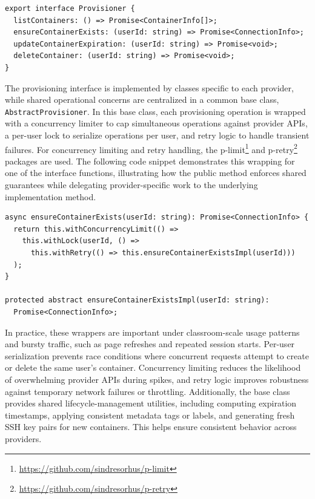 \begin{verbatim}
export interface Provisioner {
  listContainers: () => Promise<ContainerInfo[]>;
  ensureContainerExists: (userId: string) => Promise<ConnectionInfo>;
  updateContainerExpiration: (userId: string) => Promise<void>;
  deleteContainer: (userId: string) => Promise<void>;
}
\end{verbatim}

The provisioning interface is implemented by classes specific to each provider, while shared operational concerns are centralized in a common base class, \texttt{AbstractProvisioner}.
In this base class, each provisioning operation is wrapped with a concurrency limiter to cap simultaneous operations against provider APIs, a per-user lock to serialize operations per user, and retry logic to handle transient failures.
For concurrency limiting and retry handling, the p-limit\footnote{\url{https://github.com/sindresorhus/p-limit}} and p-retry\footnote{\url{https://github.com/sindresorhus/p-retry}} packages are used.
The following code snippet demonstrates this wrapping for one of the interface functions, illustrating how the public method enforces shared guarantees while delegating provider-specific work to the underlying implementation method.

\begin{verbatim}
async ensureContainerExists(userId: string): Promise<ConnectionInfo> {
  return this.withConcurrencyLimit(() =>
    this.withLock(userId, () =>
      this.withRetry(() => this.ensureContainerExistsImpl(userId)))
  );
}

protected abstract ensureContainerExistsImpl(userId: string):
  Promise<ConnectionInfo>;
\end{verbatim}

In practice, these wrappers are important under classroom-scale usage patterns and bursty traffic, such as page refreshes and repeated session starts.
Per-user serialization prevents race conditions where concurrent requests attempt to create or delete the same user's container.
Concurrency limiting reduces the likelihood of overwhelming provider APIs during spikes, and retry logic improves robustness against temporary network failures or throttling.
Additionally, the base class provides shared lifecycle-management utilities, including computing expiration timestamps, applying consistent metadata tags or labels, and generating fresh SSH key pairs for new containers.
This helps ensure consistent behavior across providers.

